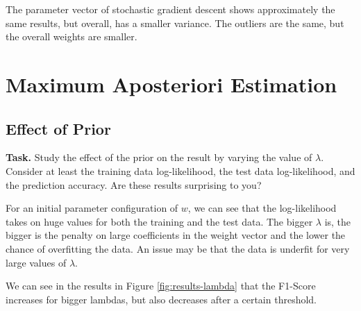 \documentclass{support/acm_proc_article-sp}
\begin{document}
    The parameter vector of stochastic gradient descent shows approximately the same results, but overall, has a smaller variance.
    The outliers are the same, but the overall weights are smaller.


    \section{Maximum Aposteriori Estimation}
    \vspace{1.5\baselineskip}



    \subsection{Effect of Prior}
    \label{sec:effect-prior}
    \vspace{\baselineskip}

    \textbf{Task.} Study the effect of the prior on the result by varying the value of $\lambda$.
    Consider at least the training data log-likelihood, the test data log-likelihood, and the prediction accuracy.
    Are these results surprising to you?

    For an initial parameter configuration of $w$, we can see that the log-likelihood takes on huge values for both the
    training and the test data.
    The bigger $\lambda$ is, the bigger is the penalty on large coefficients in the weight vector and the lower the chance
    of overfitting the data.
    An issue may be that the data is underfit for very large values of $\lambda$.

    We can see in the results in Figure \ref{fig:results-lambda} that the F1-Score increases for bigger lambdas, but
    also decreases after a certain threshold.
\end{document}
